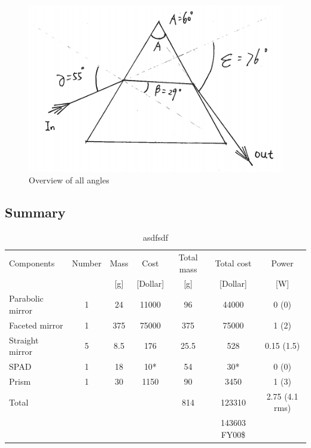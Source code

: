 \begin{figure}[ht!]
\centering
\includegraphics[scale = 0.8]{chapters/img/prism_final.png}
\caption{Overview of all angles}
\label{fig:prism_final}
\end{figure}

\subsection{Summary}
\label{sum}

\begin{table}[ht!]
\begin{tabular}{l | c | c c | c c | c }
Components         & Number & Mass & Cost & Total mass & Total cost & Power\\ 
                   &   & [g] & [Dollar]& [g]  &[Dollar] & [W]         \\ \hline \hline
Parabolic mirror   & 1 & 24  & 11000& 96   & 44000 &  0 (0)      \\
Faceted mirror     & 1 & 375 & 75000& 375  & 75000 &  1 (2)      \\ 
Straight mirror    & 5 & 8.5 & 176  & 25.5 & 528   &  0.15 (1.5) \\
\acs{SPAD}         & 1 & 18  & 10*  & 54   & 30*   &  0 (0)      \\
Prism              & 1 & 30  & 1150 & 90   & 3450  &  1 (3)      \\ \hline
Total              &   &     &      & 814  & 123310& 2.75 (4.1 rms) \\
                   &   &     &      &      & 143603 FY00\$ &
\end{tabular}
\caption{asdfsdf}
\label{tab:receiverbudget}
\end{table}